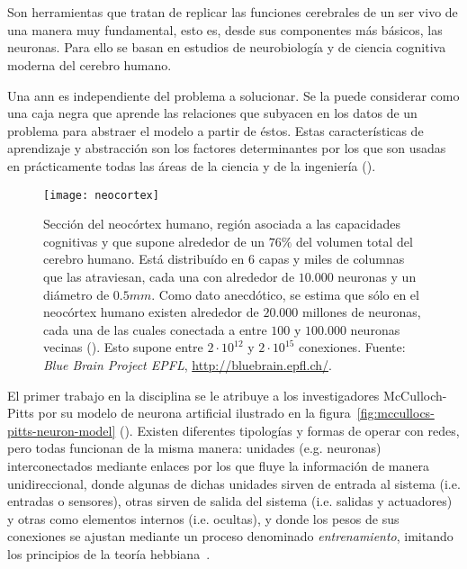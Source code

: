 \section{}

Son herramientas que tratan de replicar las funciones cerebrales de un ser vivo de una manera muy fundamental, esto es, desde sus componentes más básicos, las neuronas. Para ello se basan en estudios de neurobiología y de ciencia cognitiva moderna del cerebro humano.

Una \gls{ann} es independiente del problema a solucionar. Se la puede considerar como una caja negra que aprende las relaciones que subyacen en los datos de un problema para abstraer el modelo a partir de éstos. Estas características de aprendizaje y abstracción son los factores determinantes por los que son usadas en prácticamente todas las áreas de la ciencia y de la ingeniería (\cite{Du2006}).

\begin{figure}[t]
	\centering
	\texttt{[image: neocortex]}
	\caption[Ilustración de una sección del neocórtex humano]{Sección del neocórtex humano, región asociada a las capacidades cognitivas y que supone alrededor de un $76\%$ del volumen total del cerebro humano. Está distribuído en $6$ capas y miles de columnas que las atraviesan, cada una con alrededor de $10.000$ neuronas y un diámetro de $0.5mm$.  Como dato anecdótico, se estima que sólo en el neocórtex humano existen alrededor de $20.000$ millones de neuronas, cada una de las cuales conectada a entre $100$ y $100.000$ neuronas vecinas (\cite{Pakkenberg1997}). Esto supone entre $2 \cdot 10^{12}$ y $2 \cdot 10^{15}$ conexiones. Fuente: \textit{Blue Brain Project EPFL}, \url{http://bluebrain.epfl.ch/}.}
	\label{fig:neocortex}
\end{figure}

El primer trabajo en la disciplina se le atribuye a  los investigadores McCulloch-Pitts por su modelo de neurona artificial ilustrado en la figura~\ref{fig:mccullocs-pitts-neuron-model} (\cite{McCulloch1943}). Existen diferentes tipologías y formas de operar con redes, pero todas funcionan de la misma manera: unidades (e.g. neuronas) interconectados mediante enlaces por los que fluye la información de manera unidireccional, donde algunas de dichas unidades sirven de entrada al sistema (i.e. entradas o sensores), otras sirven de salida del sistema (i.e. salidas y actuadores) y otras como elementos internos (i.e. ocultas), y donde los pesos de sus conexiones se ajustan mediante un proceso denominado \textit{entrenamiento}, imitando los principios de la teoría hebbiana~\cite{hebb19680}.

